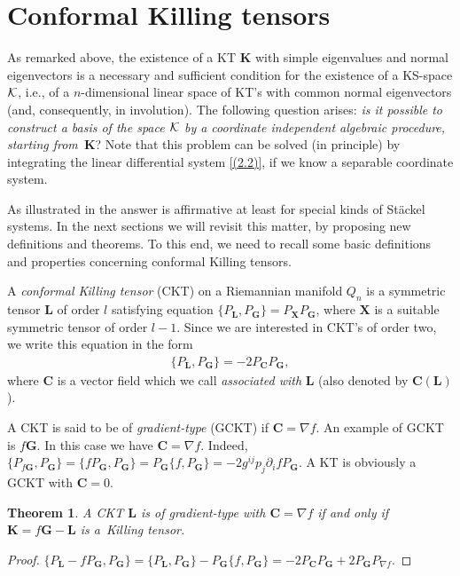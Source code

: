 \documentclass[pdftex]{sigma}
\def\bs{\boldsymbol}
\numberwithin{equation}{section}
\newtheorem{Theorem}{Theorem}[section]
 { \theoremstyle{definition}
\newtheorem{Notation}[Theorem]{Notation}
\newtheorem{Example}[Theorem]{Example}
\newtheorem{Remark}[Theorem]{Remark}
\newtheorem{Remarks}[Theorem]{Remarks}
 }
\begin{document}
\section{Conformal Killing tensors}\label{section6}

As remarked above, the existence of a KT $\bs K$ with simple eigenvalues and normal eigenvectors is a necessary and suf\/f\/icient condition for the existence of a KS-space $\cal K$, i.e., of a $n$-dimensional linear space of KT's with common normal eigenvectors (and, consequently, in involution). The following question arises: {\it is it possible to construct a basis of the space $\cal K$ by a coordinate independent algebraic procedure, starting from~$\bs K$}? Note that this problem can be solved (in principle) by integrating the linear dif\/ferential system \eqref{(2.2)}, if we know a separable coordinate system.

As illustrated in \cite{Benenti-1992b} the answer is af\/f\/irmative at least for special kinds of St\"ackel systems. In the next sections we will revisit this matter, by proposing new def\/initions and theorems. To this end, we need to recall some basic def\/initions and properties concerning conformal Killing tensors.

A {\it conformal Killing tensor} (CKT) on a Riemannian manifold $Q_n$ is a symmetric tensor $\bs L$ of order $l$ satisfying equation $\{P_{\bs L},P_{\bs G}\}=P_{\bs X} P_{\bs G}$, where $\bs X$ is a suitable symmetric tensor of order $l-1$. Since we are interested in CKT's of order two, we write this equation in the form
\begin{gather}
\{P_{\bs L},P_{\bs G}\}= -2 P_{\bs C} P_{\bs G},
\label{(6.1)}
\end{gather}
where $\bs C$ is a vector f\/ield which we call {\it associated with} $\bs L$ (also denoted by $\bs C(\bs L)$).

A CKT is said to be of {\it gradient-type} (GCKT) if $\bs C=\nabla f$. An example of GCKT is $f \bs G$. In this case we have $\bs C=\nabla f$. Indeed, $\{P_{f\bs G},P_{\bs G}\}=\{fP_{\bs G},P_{\bs G}\}=
P_{\bs G}\{f,P_{\bs G}\}= -2g^{ij}p_j\partial_if P_{\bs G}$.
A KT is obviously a GCKT with $\bs C=0$.

\begin{Theorem} \label{t:6.1}
A CKT $\bs L$ is of gradient-type with $\bs C=\nabla f$ if and only if
$\bs K=f \bs G-\bs L$ is a~Killing tensor.
\end{Theorem}

\begin{proof} $\{P_{\bs L}-fP_{\bs G}, P_{\bs G}\}=\{P_{\bs L},P_{\bs G}\}-P_{\bs G}\{f,P_{\bs G}\}= -2P_{\bs C}P_{\bs G}+2P_{\bs G}P_{\nabla f}$.
\end{proof}
\end{document}

